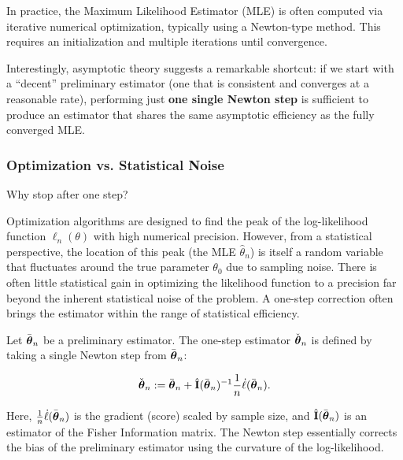 In practice, the Maximum Likelihood Estimator (MLE) is often computed via iterative numerical optimization, typically using a Newton-type method. This requires an initialization and multiple iterations until convergence.

Interestingly, asymptotic theory suggests a remarkable shortcut: if we start with a ``decent'' preliminary estimator (one that is consistent and converges at a reasonable rate), performing just \textbf{one single Newton step} is sufficient to produce an estimator that shares the same asymptotic efficiency as the fully converged MLE.

\subsubsection{Optimization vs. Statistical Noise}
Why stop after one step? 

Optimization algorithms are designed to find the peak of the log-likelihood function $\ell_n(\theta)$ with high numerical precision. However, from a statistical perspective, the location of this peak (the MLE $\hat{\theta}_n$) is itself a random variable that fluctuates around the true parameter $\theta_0$ due to sampling noise. There is often little statistical gain in optimizing the likelihood function to a precision far beyond the inherent statistical noise of the problem. A one-step correction often brings the estimator within the range of statistical efficiency.

\bigskip

Let $\bar{\boldsymbol{\theta}}_n$ be a preliminary estimator. The one-step estimator $\check{\boldsymbol{\theta}}_n$ is defined by taking a single Newton step from $\bar{\boldsymbol{\theta}}_n$:

\begin{equation}
\label{eq:onestep_def}
\check{\boldsymbol{\theta}}_n := \bar{\boldsymbol{\theta}}_n + \hat{\mathbf{I}}(\bar{\boldsymbol{\theta}}_n)^{-1} \frac{1}{n} \dot{\ell}(\bar{\boldsymbol{\theta}}_n).
\end{equation}

Here, $\frac{1}{n} \dot{\ell}(\bar{\boldsymbol{\theta}}_n)$ is the gradient (score) scaled by sample size, and $\hat{\mathbf{I}}(\bar{\boldsymbol{\theta}}_n)$ is an estimator of the Fisher Information matrix. The Newton step essentially corrects the bias of the preliminary estimator using the curvature of the log-likelihood.

